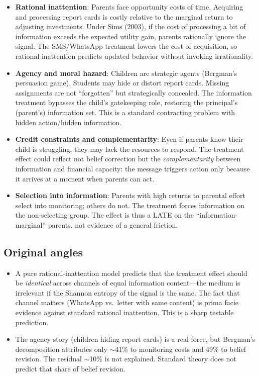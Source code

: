 \documentclass[11pt]{article}
\begin{document}
\begin{itemize}
  \item \textbf{Rational inattention}: Parents face opportunity costs of time. Acquiring and processing report cards is costly relative to the marginal return to adjusting investments. Under Sims (2003), if the cost of processing a bit of information exceeds the expected utility gain, parents rationally ignore the signal. The SMS/WhatsApp treatment lowers the cost of acquisition, so rational inattention predicts updated behavior without invoking irrationality.
  \item \textbf{Agency and moral hazard}: Children are strategic agents (Bergman's persuasion game). Students may hide or distort report cards. Missing assignments are not ``forgotten'' but strategically concealed. The information treatment bypasses the child's gatekeeping role, restoring the principal's (parent's) information set. This is a standard contracting problem with hidden action/hidden information.
  \item \textbf{Credit constraints and complementarity}: Even if parents know their child is struggling, they may lack the resources to respond. The treatment effect could reflect not belief correction but the \emph{complementarity} between information and financial capacity: the message triggers action only because it arrives at a moment when parents can act.
  \item \textbf{Selection into information}: Parents with high returns to parental effort select into monitoring; others do not. The treatment forces information on the non-selecting group. The effect is thus a LATE on the ``information-marginal'' parents, not evidence of a general friction.
\end{itemize}

\subsection{Original angles}

\begin{itemize}
  \item A pure rational-inattention model predicts that the treatment effect should be \emph{identical} across channels of equal information content---the medium is irrelevant if the Shannon entropy of the signal is the same. The fact that channel matters (WhatsApp vs.\ letter with same content) is prima facie evidence against standard rational inattention. This is a sharp testable prediction.
  \item The agency story (children hiding report cards) is a real force, but Bergman's decomposition attributes only $\sim$41\% to monitoring costs and 49\% to belief revision. The residual $\sim$10\% is not explained. Standard theory does not predict that share of belief revision.
\end{itemize}
\end{document}
